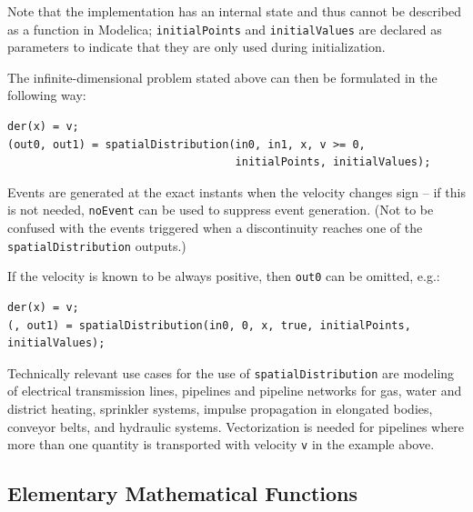 \begin{nonnormative}
Note that the implementation has an internal state and thus cannot be described as a function in Modelica; \lstinline!initialPoints! and \lstinline!initialValues! are declared as parameters to indicate that they are only used during initialization.

The infinite-dimensional problem stated above can then be formulated in the following way:
\begin{lstlisting}[language=modelica]
der(x) = v;
(out0, out1) = spatialDistribution(in0, in1, x, v >= 0,
                                   initialPoints, initialValues);
\end{lstlisting}

Events are generated at the exact instants when the velocity changes sign -- if this is not needed, \lstinline!noEvent! can be used to suppress event generation.
(Not to be confused with the events triggered when a discontinuity reaches one of the \lstinline!spatialDistribution! outputs.)

If the velocity is known to be always positive, then \lstinline!out0! can be omitted, e.g.:
\begin{lstlisting}[language=modelica]
der(x) = v;
(, out1) = spatialDistribution(in0, 0, x, true, initialPoints, initialValues);
\end{lstlisting}
Technically relevant use cases for the use of \lstinline!spatialDistribution! are modeling of electrical transmission lines, pipelines and pipeline networks for gas, water and district heating, sprinkler systems, impulse propagation in elongated bodies, conveyor belts, and hydraulic systems.
Vectorization is needed for pipelines where more than one quantity is transported with velocity \lstinline!v! in the example above.
\end{nonnormative}


\subsection{Elementary Mathematical Functions}\label{built-in-mathematical-functions-and-external-built-in-functions}

